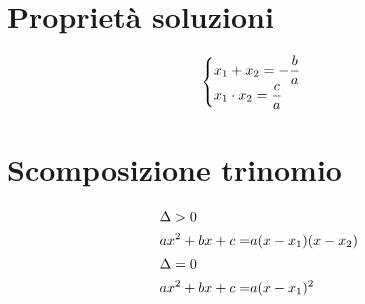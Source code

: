 \section{Proprietà soluzioni}
\begin{equation}
\begin{cases}
x_1+x_2=-\dfrac{b}{a}\\
x_1\cdot x_2=\dfrac{c}{a}
\end{cases}\index{Equazione!secondo grado!somma soluzioni}\index{Equazione!secondo grado!prodotto soluzioni}
\end{equation}
\section{Scomposizione trinomio}
\begin{align}
\intertext{$\Delta>0$}
ax^2+bx+c=&a(x-x_1)(x-x_2)\\
\intertext{$\Delta=0$}
ax^2+bx+c=&a(x-x_1)^2
\end{align}